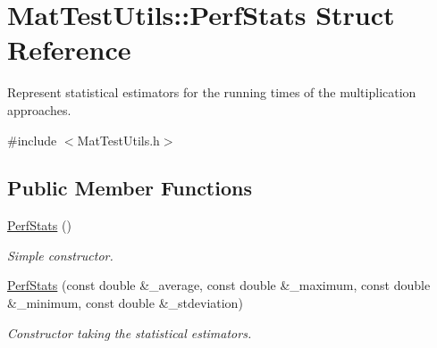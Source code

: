 \hypertarget{structMatTestUtils_1_1PerfStats}{}\section{Mat\+Test\+Utils\+:\+:Perf\+Stats Struct Reference}
\label{structMatTestUtils_1_1PerfStats}


Represent statistical estimators for the running times of the multiplication approaches.  




{\ttfamily \#include $<$Mat\+Test\+Utils.\+h$>$}

\subsection*{Public Member Functions}
\begin{DoxyCompactItemize}
\item 
\mbox{\label{structMatTestUtils_1_1PerfStats_a263c5df4f6f542fb2f4e30d14eed2710}} 
\mbox{\hyperlink{structMatTestUtils_1_1PerfStats_a263c5df4f6f542fb2f4e30d14eed2710}{Perf\+Stats}} ()
\begin{DoxyCompactList}\small\item\em Simple constructor. \end{DoxyCompactList}\item 
\mbox{\hyperlink{structMatTestUtils_1_1PerfStats_a3f58c1e90e5b3c9266b25ba162d34a14}{Perf\+Stats}} (const double \&\+\_\+average, const double \&\+\_\+maximum, const double \&\+\_\+minimum, const double \&\+\_\+stdeviation)
\begin{DoxyCompactList}\small\item\em Constructor taking the statistical estimators. \end{DoxyCompactList}\end{DoxyCompactItemize}
